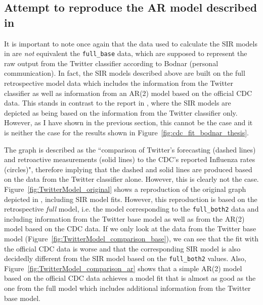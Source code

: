 \documentclass[11pt, a4paper,twoside]{report}\usepackage[]{graphicx}\usepackage[]{color}
\begin{document}
\subsection{Attempt to reproduce the AR model described in \cite{bodnar_data_2015}}
It is important to note once again that the data used to calculate the SIR models in \cite{bodnar_data_2015} are \textit{not} equivalent the \texttt{full\_base} data, which are supposed to represent the raw output from the Twitter classifier according to Bodnar (personal communication). In fact, the SIR models described above are built on the full retrospective model data which includes the information from the Twitter classifier as well as information from an AR(2) model based on the official CDC data. This stands in contrast to the report in \cite{bodnar_data_2015}, where the SIR models are depicted as being based on the information from the Twitter classifier only. However, as I have shown in the previous section, this cannot be the case and it is neither the case for the results shown in Figure~\ref{fig:cdc_fit_bodnar_thesis}.

The graph is described as the ``comparison of Twitter's forecasting (dashed lines) and retroactive measurements (solid lines) to the CDC's reported Influenza rates (circles)", therefore implying that the dashed and solid lines are produced based on the data from the Twitter classifier alone. However, this is clearly not the case. Figure~\ref{fig:TwitterModel_original} shows a reproduction of the original graph depicted in \citep{bodnar_data_2015}, including SIR model fits. However, this reproduction is based on the retrospective \textit{full} model, i.e. the model corresponding to the \texttt{full\_both2} data and including information from the Twitter base model as well as from the AR(2) model based on the CDC data. If we only look at the data from the Twitter base model (Figure~\ref{fig:TwitterModel_comparison_base}), we can see that the fit with the official CDC data is worse and that the corresponding SIR model is also decidedly different from the SIR model based on the \texttt{full\_both2} values. Also, Figure~\ref{fig:TwitterModel_comparison_ar} shows that a simple AR(2) model based on the official CDC data achieves a model fit that is almost as good as the one from the full model which includes additional information from the Twitter base model.
\end{document}
